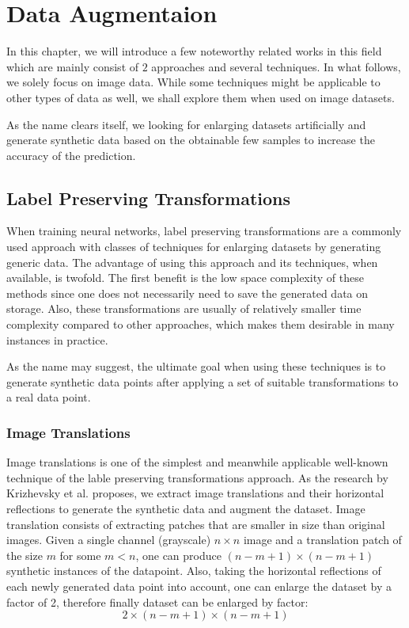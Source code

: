 \chapter{Data Augmentaion}

In this chapter, we will introduce a few noteworthy related works in this field which are mainly consist of $2$ approaches and several techniques.
In what follows, we solely focus on image data.  While some techniques might be applicable to other
types of data as well, we shall explore them when used on image datasets.

As the name clears itself, we looking for enlarging datasets artificially and generate synthetic
data based on the obtainable few samples to increase the accuracy of the prediction.

\section{Label Preserving Transformations}
\label{tit:label-preserving}
When training neural networks, label preserving transformations are a commonly used approach with classes of
techniques for enlarging datasets by generating generic data. The advantage of using this approach
and its techniques, when available, is twofold. The first benefit is the low space complexity of these
methods since one does not necessarily need to save the generated data on storage. Also, these
transformations are usually of relatively smaller time complexity compared to other approaches,
which makes them desirable in many instances in practice.

As the name may suggest, the ultimate goal when using these techniques is to generate synthetic data points after applying a set of suitable transformations to a real data point.

\subsection{Image Translations}
Image translations is one of the simplest and meanwhile applicable well-known technique of the lable
preserving transformations approach. As the research by Krizhevsky et al.
\cite{image_translation_paper} proposes, we extract
image translations and their horizontal reflections to generate the synthetic data and augment the
dataset. Image translation consists of extracting patches that are smaller in size than original
images. Given a single channel (grayscale) $n \times n$ image and a translation patch of the size
$m$ for some $m<n$, one can produce $(n-m+1) \times (n-m+1) $ synthetic instances of the datapoint. Also, taking
the horizontal reflections of each newly generated data point into account, one can enlarge the
dataset by a factor of 2, therefore finally dataset can be enlarged by factor: $$2\times(n-m+1)\times(n-m+1)$$


